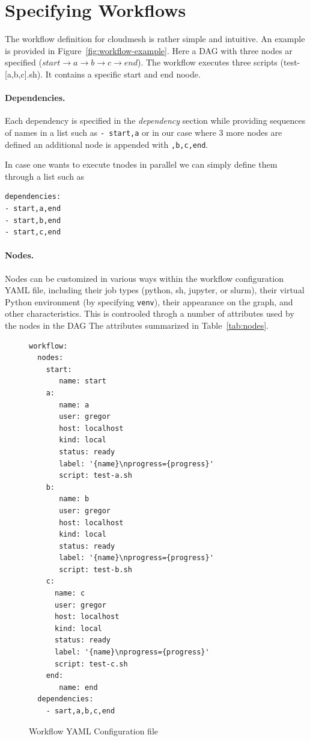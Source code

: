 
\section{Specifying Workflows}\label{specifying-workflows}

The workflow definition for cloudmesh is rather simple and intuitive.
An example is provided in Figure~\ref{fig:workflow-example}.  Here a
DAG with three nodes ar specified ($start \rightarrow a \rightarrow b \rightarrow c \rightarrow end $). The workflow executes three scripts (test-[a,b,c].sh). It contains a specific start and end noode.

\paragraph{Dependencies.}
Each dependency is specified in the {\em dependency} section while
providing sequences of names in a list such as \verb|- start,a| or in our
case where 3 more nodes are defined an additional node is appended
with \verb|,b,c,end|.

In case one wants to execute tnodes in parallel we can simply define them through a list such as

\begin{verbatim}
dependencies:
- start,a,end
- start,b,end
- start,c,end
\end{verbatim}

\paragraph{Nodes.}
Nodes can be customized in various ways within the workflow
configuration YAML file, including their job types (python, sh, jupyter,
or slurm), their virtual Python environment (by specifying
\texttt{venv}), their appearance on the graph, and other
characteristics.
This is controoled throgh a number of attributes used by the nodes in the DAG
The attributes summarized in Table~\ref{tab:nodes}.

\begin{figure}
\begin{verbatim}
workflow:
  nodes:
    start:
       name: start
    a:
       name: a
       user: gregor
       host: localhost
       kind: local
       status: ready
       label: '{name}\nprogress={progress}'
       script: test-a.sh
    b:
       name: b
       user: gregor
       host: localhost
       kind: local
       status: ready
       label: '{name}\nprogress={progress}'
       script: test-b.sh
    c:
      name: c
      user: gregor
      host: localhost
      kind: local
      status: ready
      label: '{name}\nprogress={progress}'
      script: test-c.sh
    end:
       name: end
  dependencies:
    - sart,a,b,c,end
\end{verbatim}
\caption{Workflow YAML Configuration file}\label{fig:workflow-example}
\label{fig:yaml-file}
\end{figure}

